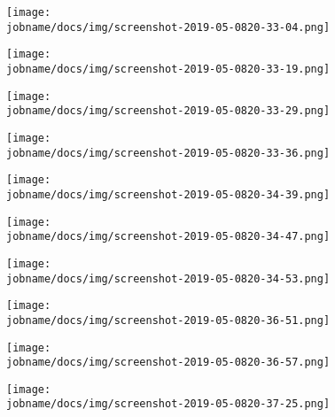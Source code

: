 \begin{figure}[h!]
    \centering
    \texttt{[image: \\jobname/docs/img/screenshot-2019-05-0820-33-04.png]}
\end{figure}

\begin{figure}[h!]
    \centering
    \texttt{[image: \\jobname/docs/img/screenshot-2019-05-0820-33-19.png]}
\end{figure}

\begin{figure}[h!]
    \centering
    \texttt{[image: \\jobname/docs/img/screenshot-2019-05-0820-33-29.png]}
\end{figure}

\begin{figure}[h!]
    \centering
    \texttt{[image: \\jobname/docs/img/screenshot-2019-05-0820-33-36.png]}
\end{figure}

\begin{figure}[h!]
    \centering
    \texttt{[image: \\jobname/docs/img/screenshot-2019-05-0820-34-39.png]}
\end{figure}

\begin{figure}[h!]
    \centering
    \texttt{[image: \\jobname/docs/img/screenshot-2019-05-0820-34-47.png]}
\end{figure}

\begin{figure}[h!]
    \centering
    \texttt{[image: \\jobname/docs/img/screenshot-2019-05-0820-34-53.png]}
\end{figure}

\begin{figure}[h!]
    \centering
    \texttt{[image: \\jobname/docs/img/screenshot-2019-05-0820-36-51.png]}
\end{figure}

\begin{figure}[h!]
    \centering
    \texttt{[image: \\jobname/docs/img/screenshot-2019-05-0820-36-57.png]}
\end{figure}

\begin{figure}[h!]
    \centering
    \texttt{[image: \\jobname/docs/img/screenshot-2019-05-0820-37-25.png]}
\end{figure}

